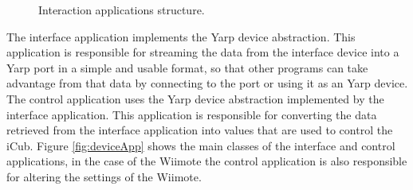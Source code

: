 \begin{figure}[htb]
  \hspace{5mm}
	  \caption{Interaction applications structure.}
	  \label{fig:interactionApps}
	\end{figure}
	
	The interface application implements the \ac{Yarp} device abstraction. This application is responsible for streaming the data from the interface device into a \ac{Yarp} port in a simple and usable format, so that other programs can take advantage from that data by connecting to the port or using it as an \ac{Yarp} device. The control application uses the \ac{Yarp} device abstraction implemented by the interface application. This application is responsible for converting the data retrieved from the interface application into values that are used to control the iCub. Figure \ref{fig:deviceApp} shows the main classes of the interface and control applications, in the case of the \ac{Wiimote} the control application is also responsible for altering the settings of the \ac{Wiimote}.
	
